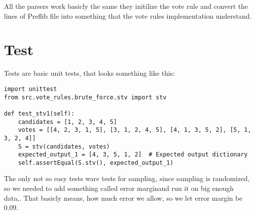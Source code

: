 \documentclass[a4paper,12pt]{report}
\begin{document}
	All the parsers work basicly the same they initilize the vote rule and convert the lines of Preflib file into something that the vote rules implementation understand.
	
	\chapter{Test}
	
	Tests are basic unit tests, that looks something like this:
	
	\begin{lstlisting}
import unittest
from src.vote_rules.brute_force.stv import stv

def test_stv1(self):
	candidates = [1, 2, 3, 4, 5]
	votes = [[4, 2, 3, 1, 5], [3, 1, 2, 4, 5], [4, 1, 3, 5, 2], [5, 1, 3, 2, 4]]
	S = stv(candidates, votes)
	expected_output_1 = [4, 3, 5, 1, 2]  # Expected output dictionary
	self.assertEqual(S.stv(), expected_output_1)
	\end{lstlisting}
	
	The only not so easy tests ware tests for sampling, since sampling is randomized, so we needed to add something called error marginand run it on big enough data,. That basicly means, how much error we allow, so we let error margin be $0.09$.
	
	
\end{document}
